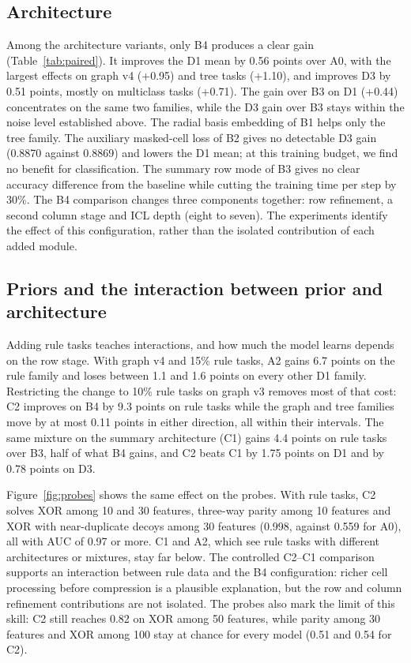 \documentclass[11pt]{article}
\begin{document}
\subsection{Architecture}
Among the architecture variants, only B4 produces a clear gain (Table~\ref{tab:paired}). It improves
the D1 mean by 0.56 points over A0, with the largest effects on graph v4 (+0.95) and tree tasks
(+1.10), and improves D3 by 0.51 points, mostly on multiclass tasks (+0.71). The gain over B3 on D1
(+0.44) concentrates on the same two families, while the D3 gain over B3 stays within the noise
level established above. The radial basis embedding of B1 helps only the tree family. The auxiliary
masked-cell loss of B2 gives no detectable D3 gain (0.8870 against 0.8869) and lowers the D1 mean;
at this training budget, we find no benefit for classification. The summary row mode of
B3 gives no clear accuracy difference from the baseline while cutting the training time per step by 30\%.
The B4 comparison changes three components together: row refinement, a second column stage and
ICL depth (eight to seven). The experiments identify the effect of this configuration, rather than
the isolated contribution of each added module.

\subsection{Priors and the interaction between prior and architecture}
Adding rule tasks teaches interactions, and how much the model learns depends on the row stage. With
graph v4 and 15\% rule tasks, A2 gains 6.7 points on the rule family and loses between 1.1 and 1.6
points on every other D1 family. Restricting the change to 10\% rule tasks on graph v3 removes most of
that cost: C2 improves on B4 by 9.3 points on rule tasks while the graph and tree families move by at
most 0.11 points in either direction, all within their intervals. The same mixture on the summary
architecture (C1) gains 4.4 points on rule tasks over B3, half of what B4 gains, and C2 beats C1 by
1.75 points on D1 and by 0.78 points on D3.

Figure~\ref{fig:probes} shows the same effect on the probes. With rule tasks, C2 solves XOR among 10
and 30 features, three-way parity among 10 features and XOR with near-duplicate decoys among 30
features (0.998, against 0.559 for A0), all with AUC of 0.97 or more. C1 and A2, which see rule tasks
with different architectures or mixtures, stay far below. The controlled C2--C1 comparison supports
an interaction between rule data and the B4 configuration: richer cell processing before compression
is a plausible explanation, but the row and column refinement contributions are not isolated.
The probes also mark the limit of this skill: C2 still reaches 0.82 on XOR among 50 features,
while parity among 30 features and XOR among 100 stay at chance for every model (0.51 and 0.54 for
C2).
\end{document}
